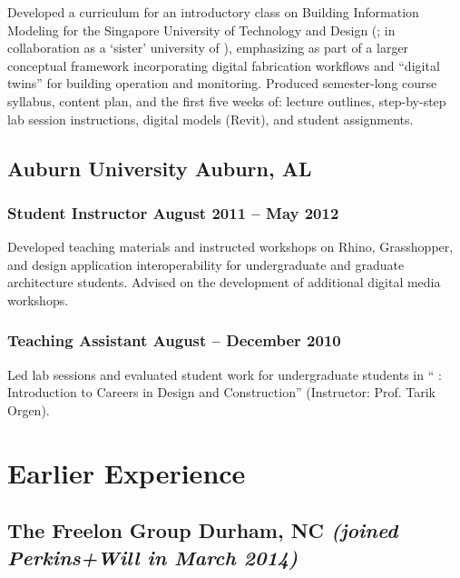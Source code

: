 \documentclass[letterpaper, oneside, 10pt]{article}
\begin{document}
Developed a curriculum for an introductory class on Building Information
Modeling  for the Singapore University of Technology and Design
(; in collaboration as a `sister' university of ), emphasizing
 as part of a larger conceptual framework incorporating digital
fabrication workflows and ``digital twins'' for building operation and
monitoring. Produced semester-long course syllabus, content plan, and the
first five weeks of: lecture outlines, step-by-step lab session instructions,
digital models (Revit), and student assignments.


\subsection*{Auburn University\DotSep{0.25em} Auburn, AL}

\subsubsection*{Student Instructor\DotSep{0.25em} August 2011 -- May 2012}

Developed teaching materials and instructed workshops on Rhino, Grasshopper,
and design application interoperability for undergraduate and graduate
architecture students. Advised on the development of additional digital media
workshops.

\subsubsection*{Teaching Assistant\DotSep{0.25em} August -- December 2010}

Led lab sessions and evaluated student work for undergraduate students in
`` : Introduction to Careers in Design and Construction''
(Instructor: Prof. Tarik Orgen).


\section*{Earlier Experience} %

\AdjSectSpace
\suppressfalse

\subsection*{%
  The Freelon Group\DotSep{0.25em} Durham, NC\DotSep{0.25em}%
  \space\textit{(joined Perkins+Will in March 2014)}%
}
\end{document}
